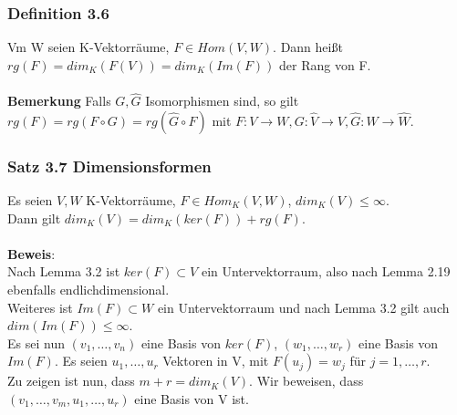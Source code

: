 \documentclass{scrartcl}
\begin{document}
\subsubsection{Definition 3.6}
Vm W seien K-Vektorr\"aume, \(F \in Hom(V, W)\). Dann hei\ss{}t \(rg(F) = dim_K(F(V)) = dim_K(Im(F))\) der Rang von F.\\
\\
\textbf{Bemerkung}
Falls \(G, \hat{G}\) Isomorphismen sind, so gilt \(rg(F) = rg(F \circ G) = rg(\hat{G} \circ F)\) mit \(F : V \to W, G : \hat{V} \to V, \hat{G} : W \to \hat{W}\).

\subsubsection{Satz 3.7 Dimensionsformen}
Es seien \(V, W\) K-Vektorr\"aume, \(F \in Hom_K(V, W)\), \(dim_K(V) \le \infty\).\\
Dann gilt \(dim_K(V) = dim_K(ker(F)) + rg(F)\).\\
\\
\textbf{Beweis}:\\
Nach Lemma 3.2 ist \(ker(F) \subset V\) ein Untervektorraum, also nach Lemma 2.19 ebenfalls endlichdimensional.\\
Weiteres ist \(Im(F) \subset W\) ein Untervektorraum und nach Lemma 3.2 gilt auch\\
\(dim(Im(F)) \le \infty\).\\
Es sei nun \((v_1, \dots, v_n)\) eine Basis von \(ker(F)\), \((w_1, \dots, w_r)\) eine Basis von \(Im(F)\). Es seien \(u_1, \dots, u_r\) Vektoren in V, mit \(F(u_j) = w_j\) f\"ur \(j = 1, \dots, r\).\\
Zu zeigen ist nun, dass \(m + r = dim_K(V)\). Wir beweisen, dass \((v_1, \dots, v_m, u_1, \dots, u_r)\) eine Basis von V ist.
\end{document}
